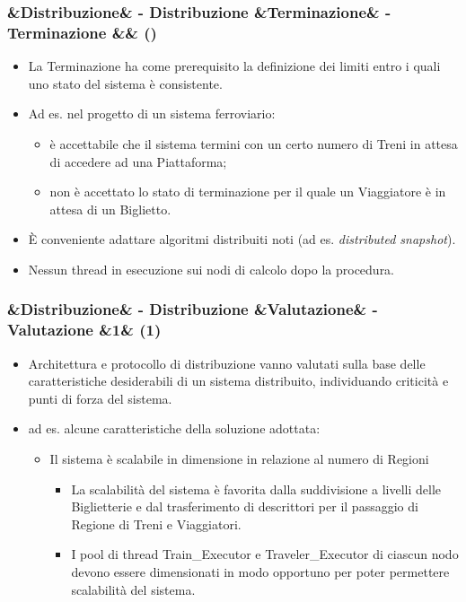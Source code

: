 \documentclass[slidestop,compress,blackandwhite]{beamer}
\newcommand{\ii}[1]{\textit{#1}}
\newcommand{\cm}[1]{\vspace{#1cm}}
\newcommand{\newtitle}[4]{
	#1 
	\ifx&#2&%
	\else
  		\large- #2
	\fi
	\ifx&#3&%
	\else
  		\normalsize- #3
	\fi
	\ifx&#4&%
	\else
  		\normalsize (#4)
	\fi
}
\newcommand{\newframe}[5]{
	\begin{frame}
		\frametitle{\newtitle{#1}{#2}{#3}{#4}}
		#5
	\end{frame}
}
\newcommand{\myitemize}[1]{
	\begin{itemize}\itemsep4pt
	#1
	\end{itemize}
}
\begin{document}
	\newframe{}{Distribuzione}{Terminazione}{}{
		\cm{0.5}
		\myitemize{
			\item La Terminazione ha come prerequisito la definizione dei limiti entro i quali uno stato del sistema è consistente. 
			\item Ad es. nel progetto di un sistema ferroviario:
				\myitemize {
					\item è accettabile che il sistema termini con un certo numero di Treni in attesa di accedere ad una Piattaforma;
					\item non è accettato lo stato di terminazione per il quale un Viaggiatore è in attesa di un Biglietto.
				}
			\item \`E conveniente adattare algoritmi distribuiti noti (ad es. \ii{distributed snapshot}).
			\item Nessun thread in esecuzione sui nodi di calcolo dopo la procedura.
		}
	}
	
	\newframe{}{Distribuzione}{Valutazione}{1}{
		\myitemize {
			\item Architettura e protocollo di distribuzione vanno valutati sulla base delle caratteristiche desiderabili di un sistema distribuito, individuando criticità e punti di forza del sistema.
			\item ad es. alcune caratteristiche della soluzione adottata:\\
				\myitemize {
					\item Il sistema è scalabile in dimensione in relazione al numero di Regioni\\
						\myitemize {
							\item La scalabilità del sistema è favorita dalla suddivisione a livelli delle Biglietterie e dal trasferimento di descrittori per il passaggio di Regione di Treni e Viaggiatori.
							\item I pool di thread Train\_Executor e Traveler\_Executor di ciascun nodo devono essere dimensionati in modo opportuno per poter permettere scalabilità del sistema.
						}
				}
		}
	}
	
\end{document}
